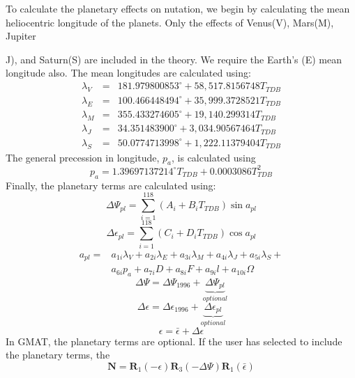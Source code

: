 To calculate the planetary effects on nutation, we begin by
calculating the mean heliocentric longitude of the planets.  Only
the effects of Venus(V), Mars(M),  Jupiter{J), and Saturn(S) are
included in the theory. We require the Earth's (E) mean longitude
also.  The mean longitudes are calculated using:
%
\begin{eqnarray}
    \lambda_{V} &=& 181.979800853^\circ + 58,517.8156748T_{TDB} \nonumber \\
    \lambda_{E} &=& 100.466448494^\circ + 35,999.3728521T_{TDB} \nonumber \\
    \lambda_{M} &=& 355.433274605^\circ + 19,140.299314T_{TDB} \nonumber \\
    \lambda_{J} &=& 34.351483900^\circ + 3,034.90567464T_{TDB} \nonumber \\
    \lambda_{S} &=& 50.0774713998^\circ + 1,222.11379404T_{TDB} \nonumber
\end{eqnarray}
%
The general precession in longitude, $p_a$, is calculated using
%
\begin{equation}
    p_a = 1.39697137214^\circ T_{TDB} + 0.0003086T_{TDB}^2 \nonumber
\end{equation}
%
Finally, the planetary terms are calculated using:
%
\begin{equation}
     \Delta \Psi_{pl} = \sum_{i=1}^{118}\left( A_i + B_i T_{TDB}
     \right) \sin{a_{pl}}
\end{equation}
%
\begin{equation}
     \Delta \epsilon_{pl} = \sum_{i=1}^{118}\left( C_i + D_i T_{TDB}
     \right) \cos{a_{pl}}
\end{equation}
%
\begin{eqnarray}
     a_{pl} = &a_{1i} \lambda_V + a_{2i} \lambda_E + a_{3i} \lambda_M + a_{4i}\lambda_J + a_{5i} \lambda_S + \nonumber\\
     &a_{6i} p_a + a_{7i}D  + a_{8i}F +
    a_{9i} l +  a_{10i}\Omega
\end{eqnarray}
%
\begin{equation}
     \Delta\Psi = \Delta\Psi_{1996} +
     \underbrace{\Delta\Psi_{pl}}_{optional}
\end{equation}
%
\begin{equation}
     \Delta\epsilon = \Delta\epsilon_{1996} +
     \underbrace{\Delta\epsilon_{pl}}_{optional}
\end{equation}
%
\begin{equation}
    \epsilon = \bar{\epsilon} + \Delta\epsilon
\end{equation}
 In GMAT, the planetary terms are optional.  If the user has
selected to include the planetary terms, the
\begin{equation}
     \mathbf{N} = \mathbf{R}_1(-\epsilon) \mathbf{R}_3(-\Delta
     \Psi)\mathbf{R}_1(\bar \epsilon)
\end{equation}

}
